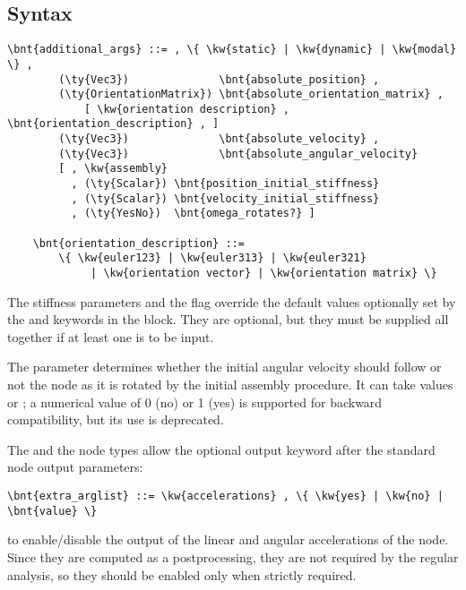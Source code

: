\subsection{Syntax}
\label{sec:NODE:STRUCTURAL:SYNTAX}
\begin{Verbatim}[commandchars=\\\{\}]
    \bnt{additional_args} ::= , \{ \kw{static} | \kw{dynamic} | \kw{modal} \} ,
        (\ty{Vec3})              \bnt{absolute_position} ,
        (\ty{OrientationMatrix}) \bnt{absolute_orientation_matrix} ,
            [ \kw{orientation description} , \bnt{orientation_description} , ]
        (\ty{Vec3})              \bnt{absolute_velocity} ,
        (\ty{Vec3})              \bnt{absolute_angular_velocity}
        [ , \kw{assembly}
          , (\ty{Scalar}) \bnt{position_initial_stiffness}
          , (\ty{Scalar}) \bnt{velocity_initial_stiffness}
          , (\ty{YesNo})  \bnt{omega_rotates?} ]

    \bnt{orientation_description} ::=
        \{ \kw{euler123} | \kw{euler313} | \kw{euler321}
             | \kw{orientation vector} | \kw{orientation matrix} \}
\end{Verbatim}

The stiffness parameters and the  flag
override the default values optionally set by the 
and  keywords in the  block. 
They are optional, but they must be supplied all together if at least
one is to be input.

The  parameter determines whether 
the initial angular velocity should follow or not the node 
as it is rotated by the initial assembly procedure.
It can take values  or ;
a numerical value of 0 (no) or 1 (yes) is supported for backward
compatibility, but its use is deprecated.

The  and the  node types allow
the optional output keyword
 after the standard node output parameters:
\begin{Verbatim}[commandchars=\\\{\}]
    \bnt{extra_arglist} ::= \kw{accelerations} , \{ \kw{yes} | \kw{no} | \bnt{value} \}
\end{Verbatim}
to enable/disable the output of the linear and angular accelerations
of the node.  Since they are computed as a postprocessing, they are not required
by the regular analysis, so they should be enabled only when strictly required.

